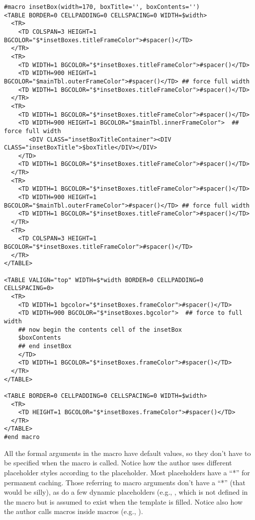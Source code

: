 \begin{verbatim}
#macro insetBox(width=170, boxTitle='', boxContents='')
<TABLE BORDER=0 CELLPADDING=0 CELLSPACING=0 WIDTH=$width>
  <TR>
    <TD COLSPAN=3 HEIGHT=1 BGCOLOR="$*insetBoxes.titleFrameColor">#spacer()</TD>
  </TR>
  <TR>
    <TD WIDTH=1 BGCOLOR="$*insetBoxes.titleFrameColor">#spacer()</TD>
    <TD WIDTH=900 HEIGHT=1 BGCOLOR="$mainTbl.outerFrameColor">#spacer()</TD> ## force full width 
    <TD WIDTH=1 BGCOLOR="$*insetBoxes.titleFrameColor">#spacer()</TD>
  </TR>
  <TR>
    <TD WIDTH=1 BGCOLOR="$*insetBoxes.titleFrameColor">#spacer()</TD>
    <TD WIDTH=900 HEIGHT=1 BGCOLOR="$mainTbl.innerFrameColor">  ## force full width 
       <DIV CLASS="insetBoxTitleContainer"><DIV CLASS="insetBoxTitle">$boxTitle</DIV></DIV>
    </TD>
    <TD WIDTH=1 BGCOLOR="$*insetBoxes.titleFrameColor">#spacer()</TD>
  </TR>
  <TR>
    <TD WIDTH=1 BGCOLOR="$*insetBoxes.titleFrameColor">#spacer()</TD>
    <TD WIDTH=900 HEIGHT=1 BGCOLOR="$mainTbl.outerFrameColor">#spacer()</TD> ## force full width 
    <TD WIDTH=1 BGCOLOR="$*insetBoxes.titleFrameColor">#spacer()</TD>
  </TR>
  <TR>
    <TD COLSPAN=3 HEIGHT=1 BGCOLOR="$*insetBoxes.titleFrameColor">#spacer()</TD>
  </TR>
</TABLE>
	    
<TABLE VALIGN="top" WIDTH=$*width BORDER=0 CELLPADDING=0 CELLSPACING=0>
  <TR>
    <TD WIDTH=1 bgcolor="$*insetBoxes.frameColor">#spacer()</TD>
    <TD WIDTH=900 BGCOLOR="$*insetBoxes.bgcolor">  ## force to full width 
    ## now begin the contents cell of the insetBox
    $boxContents
    ## end insetBox	
    </TD>
    <TD WIDTH=1 BGCOLOR="$*insetBoxes.frameColor">#spacer()</TD>
  </TR>
</TABLE>

<TABLE BORDER=0 CELLPADDING=0 CELLSPACING=0 WIDTH=$width>
  <TR>
    <TD HEIGHT=1 BGCOLOR="$*insetBoxes.frameColor">#spacer()</TD>
  </TR>
</TABLE>
#end macro
\end{verbatim}

All the formal arguments in the  macro have default values, so
they don't have to be specified when the macro is called.  Notice how the 
author uses different placeholder styles according to the placeholder.  Most
placeholders have a ``*'' for permanent caching.  Those referring to macro
arguments don't have a ``*'' (that would be silly), as do a few dynamic
placeholders (e.g., , which is not defined in
the macro but is assumed to exist when the template is filled.  Notice also
how the author calls macros inside macros (e.g., ).

